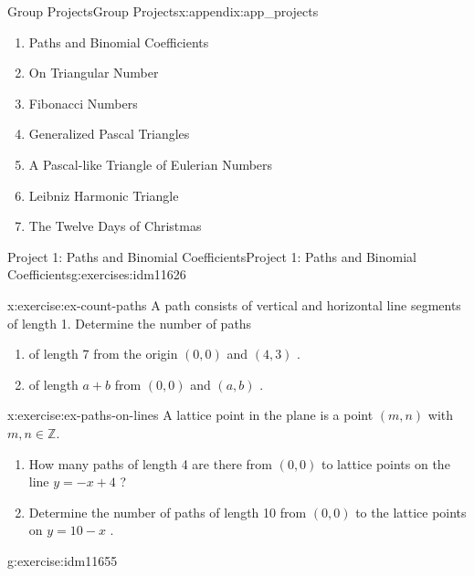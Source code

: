 \documentclass[oneside,10pt,]{book}
\numberwithin{equation}{chapter}
\def\Z{\mathbb Z}
\begin{document}
\begin{appendixptx}{Group Projects}{}{Group Projects}{}{}{x:appendix:app_projects}
\begin{introduction}{}%
%
\begin{enumerate}
\item{}Paths and Binomial Coefficients%
\item{}On Triangular Number%
\item{}Fibonacci Numbers%
\item{}Generalized Pascal Triangles%
\item{}A Pascal-like Triangle of Eulerian Numbers%
\item{}Leibniz Harmonic Triangle%
\item{}The Twelve Days of Christmas%
\end{enumerate}
%
\end{introduction}%
%
%
\typeout{************************************************}
\typeout{************************************************}
%
\begin{exercises-section-numberless}{Project 1: Paths and Binomial Coefficients}{}{Project 1: Paths and Binomial Coefficients}{}{}{g:exercises:idm11626}
\begin{divisionexercise}{1}{}{}{x:exercise:ex-count-paths}%
A path consists of vertical and horizontal line segments of length 1. Determine the number of paths%
\begin{enumerate}[label=(\alph*)]
\item{}of length 7 from the origin \(\left( 0,0 \right)\) and \((4,3)\) .%
\item{}of length \(a + b\) from \(\left( 0,0 \right)\) and \((a,b)\) .%
\end{enumerate}
%
\end{divisionexercise}%
\begin{divisionexercise}{2}{}{}{x:exercise:ex-paths-on-lines}%
A lattice point in the plane is a point \((m,n)\) with \(m,n \in \Z\).%
\begin{enumerate}[label=(\alph*)]
\item{}How many paths of length 4 are there from \((0,0)\) to lattice points on the line \(y = - x + 4\) ?%
\item{}Determine the number of paths of length 10 from \((0,0)\) to the lattice points on \(y = 10 - x\) .%
\end{enumerate}
%
\end{divisionexercise}%
\begin{divisionexercise}{3}{}{}{g:exercise:idm11655}%

\end{divisionexercise}
\end{exercises-section-numberless}
\end{appendixptx}
\end{document}
